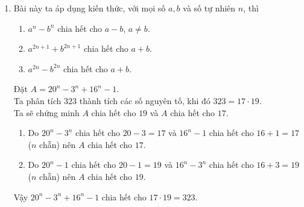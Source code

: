 \begin{ex}
{\begin{enumerate}[1.]
			\item Bài này ta áp dụng kiến thức, với mọi số $ a,b $ và số tự nhiên $ n $, thì
			\begin{enumerate}[$\bullet$]
				\item $ a^n - b^n  $ chia hết cho $  a-b $, $ a \ne b $.
				\item $ a^{2n+1} + b^{2n+1}  $ chia hết cho $  a+b $.
				\item $ a^{2n} - b^{2n}  $ chia hết cho $ a +b $.
			\end{enumerate}
			Đặt $ A=  20^n-3^n+16^n-1  $.\\
			Ta phân tích $ 323 $ thành tích các số nguyên tố, khi đó $ 323 = 17\cdot 19 $.\\
			Ta sẽ chứng minh $ A $ chia hết cho $ 19 $ và $ A $ chia hết cho $17 $.
			\begin{enumerate}[$\bullet$]
				\item Do $ 20^n-3^n $ chia hết cho $ 20-3=17 $ và $ 16^n-1 $ chia hết cho $ 16+1=17 $ ($ n $ chẵn) nên $ A $ chia hết cho $ 17 $.
				\item Do $ 20^n-1 $ chia hết cho $ 20-1=19 $ và $ 16^n- 3^n $ chia hết cho $ 16+3=19$ ($ n $ chẵn) nên $ A $ chia hết cho $ 19 $.
			\end{enumerate}
			Vậy $  20^n-3^n+16^n-1 $ chia hết cho $ 17\cdot 19=323 $.
			
		\end{enumerate}
	}
\end{ex}
